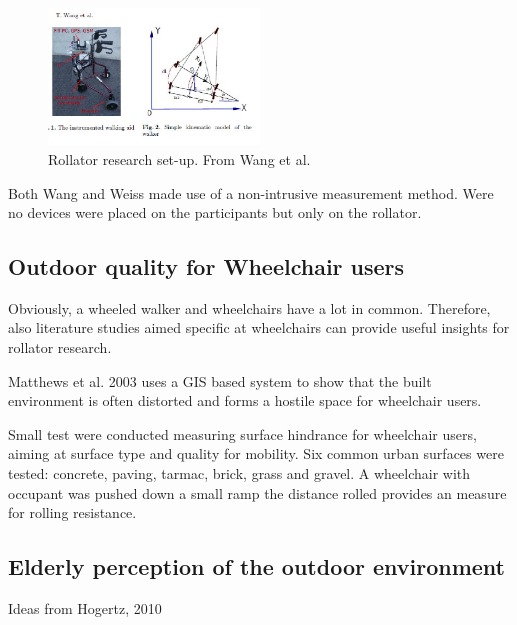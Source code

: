 \begin{figure}[h]
\includegraphics[width=0.5\textwidth]{img/B_Wang.jpg}
\centering
\caption[Rollator set-up]{Rollator research set-up. From Wang et al.~\cite{Wang2015} \label{rolsetup}}
\end{figure}


Both Wang and Weiss made use of a non-intrusive measurement method. Were no devices were placed on the participants but only on the rollator. 


\subsection{Outdoor quality for Wheelchair users}
Obviously, a wheeled walker and wheelchairs have a lot in common. Therefore, also literature studies aimed specific at wheelchairs can provide useful insights for rollator research. 

Matthews et al. 2003 uses a GIS based system to show that the built environment is often distorted and forms a hostile space for wheelchair users.~\cite{Matthews2003}

Small test were conducted measuring surface hindrance for wheelchair users, aiming at surface type and quality for mobility. Six common urban surfaces were tested: concrete, paving, tarmac, brick, grass and gravel. A wheelchair with occupant was pushed down a small ramp the distance rolled provides an measure for rolling resistance. 

\subsection{Elderly perception of the outdoor environment}
Ideas from Hogertz, 2010 ~\cite{hogertz2010}